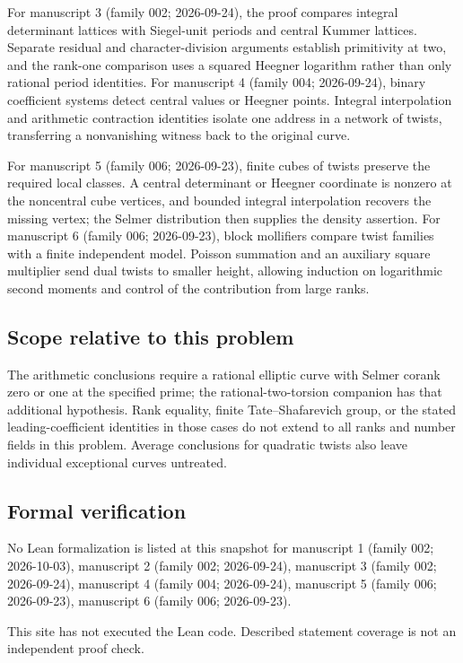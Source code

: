 \documentclass[11pt]{article}
\begin{document}
For manuscript 3 (family 002; 2026-09-24), the proof compares integral determinant lattices with Siegel-unit periods and central Kummer lattices. Separate residual and character-division arguments establish primitivity at two, and the rank-one comparison uses a squared Heegner logarithm rather than only rational period identities. For manuscript 4 (family 004; 2026-09-24), binary coefficient systems detect central values or Heegner points. Integral interpolation and arithmetic contraction identities isolate one address in a network of twists, transferring a nonvanishing witness back to the original curve.

For manuscript 5 (family 006; 2026-09-23), finite cubes of twists preserve the required local classes. A central determinant or Heegner coordinate is nonzero at the noncentral cube vertices, and bounded integral interpolation recovers the missing vertex; the Selmer distribution then supplies the density assertion. For manuscript 6 (family 006; 2026-09-23), block mollifiers compare twist families with a finite independent model. Poisson summation and an auxiliary square multiplier send dual twists to smaller height, allowing induction on logarithmic second moments and control of the contribution from large ranks.

\subsection{Scope relative to this problem}
The arithmetic conclusions require a rational elliptic curve with Selmer corank zero or one at the specified prime; the rational-two-torsion companion has that additional hypothesis. Rank equality, finite Tate--Shafarevich group, or the stated leading-coefficient identities in those cases do not extend to all ranks and number fields in this problem. Average conclusions for quadratic twists also leave individual exceptional curves untreated.

\subsection{Formal verification}
No Lean formalization is listed at this snapshot for manuscript 1 (family 002; 2026-10-03), manuscript 2 (family 002; 2026-09-24), manuscript 3 (family 002; 2026-09-24), manuscript 4 (family 004; 2026-09-24), manuscript 5 (family 006; 2026-09-23), manuscript 6 (family 006; 2026-09-23).

This site has not executed the Lean code. Described statement coverage is not an independent proof check.
\end{document}
